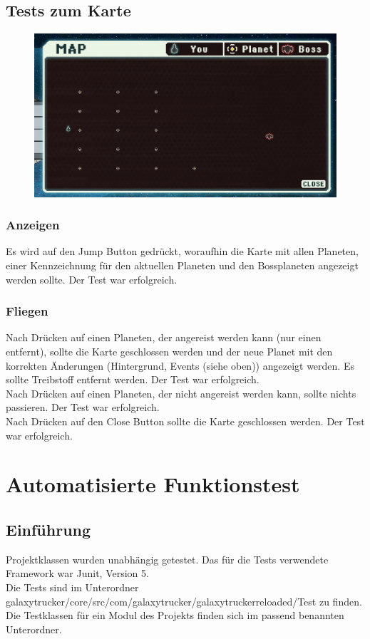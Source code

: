 \documentclass[fontsize=12pt,paper=a4,twoside]{scrartcl}
\begin{document}
\subsection{Tests zum Karte}
\begin{figure}[h!]
\centering
\includegraphics[width=0.5\linewidth]{images/map.png}
\end{figure}
\subsubsection{Anzeigen}
Es wird auf den Jump Button gedrückt, woraufhin die Karte mit allen Planeten, einer Kennzeichnung für den aktuellen Planeten und den Bossplaneten angezeigt werden sollte.  Der Test war erfolgreich. \\
\subsubsection{Fliegen}
Nach Drücken auf einen Planeten, der angereist werden kann (nur einen entfernt), sollte die Karte geschlossen werden und der neue Planet mit den korrekten Änderungen (Hintergrund, Events (siehe oben)) angezeigt werden. Es sollte Treibstoff entfernt werden.  Der Test war erfolgreich. \\
Nach Drücken auf einen Planeten, der nicht angereist werden kann, sollte nichts passieren.  Der Test war erfolgreich. \\
Nach Drücken auf den Close Button sollte die Karte geschlossen werden.  Der Test war erfolgreich. \\

\section{Automatisierte Funktionstest}
\subsection{Einführung}
Projektklassen wurden unabhängig getestet. Das für die Tests verwendete Framework war Junit, Version 5. \\
Die Tests sind im Unterordner galaxytrucker/core/src/com/galaxytrucker/galaxytruckerreloaded/Test zu finden. Die Testklassen für ein Modul des Projekts finden sich im passend benannten Unterordner. \\
\end{document}
